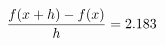 \documentclass[preview]{standalone}
\begin{document}
\begin{align*}
\special{dvisvgm:raw <g id='unique000'>}\frac{f(x+h)-f(x)}{h} = 2.183\special{dvisvgm:raw </g>}
\end{align*}
\end{document}
